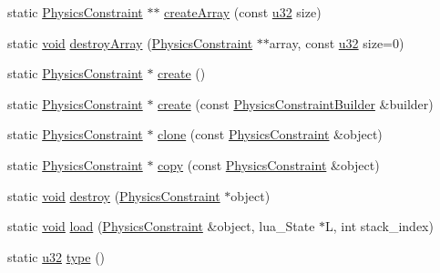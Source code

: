 \begin{DoxyCompactItemize}
\item 
static \mbox{\hyperlink{classnjli_1_1_physics_constraint}{Physics\+Constraint}} $\ast$$\ast$ \mbox{\hyperlink{classnjli_1_1_physics_constraint_a4d77bf76586344a445393a05f3295cb0}{create\+Array}} (const \mbox{\hyperlink{_util_8h_a10e94b422ef0c20dcdec20d31a1f5049}{u32}} size)
\item 
static \mbox{\hyperlink{_thread_8h_af1e856da2e658414cb2456cb6f7ebc66}{void}} \mbox{\hyperlink{classnjli_1_1_physics_constraint_a100472a7edab98f9bcd213459f3ae2c6}{destroy\+Array}} (\mbox{\hyperlink{classnjli_1_1_physics_constraint}{Physics\+Constraint}} $\ast$$\ast$array, const \mbox{\hyperlink{_util_8h_a10e94b422ef0c20dcdec20d31a1f5049}{u32}} size=0)
\item 
static \mbox{\hyperlink{classnjli_1_1_physics_constraint}{Physics\+Constraint}} $\ast$ \mbox{\hyperlink{classnjli_1_1_physics_constraint_a40da285e559ad3daf2ca60452a92a056}{create}} ()
\item 
static \mbox{\hyperlink{classnjli_1_1_physics_constraint}{Physics\+Constraint}} $\ast$ \mbox{\hyperlink{classnjli_1_1_physics_constraint_ab3c5d215f3df6f2ae6f6d1492114449b}{create}} (const \mbox{\hyperlink{classnjli_1_1_physics_constraint_builder}{Physics\+Constraint\+Builder}} \&builder)
\item 
static \mbox{\hyperlink{classnjli_1_1_physics_constraint}{Physics\+Constraint}} $\ast$ \mbox{\hyperlink{classnjli_1_1_physics_constraint_abffd36e886d036ee96c69857cfad4f9e}{clone}} (const \mbox{\hyperlink{classnjli_1_1_physics_constraint}{Physics\+Constraint}} \&object)
\item 
static \mbox{\hyperlink{classnjli_1_1_physics_constraint}{Physics\+Constraint}} $\ast$ \mbox{\hyperlink{classnjli_1_1_physics_constraint_a5c8b99c2a957918ee982a6101a4a6a8a}{copy}} (const \mbox{\hyperlink{classnjli_1_1_physics_constraint}{Physics\+Constraint}} \&object)
\item 
static \mbox{\hyperlink{_thread_8h_af1e856da2e658414cb2456cb6f7ebc66}{void}} \mbox{\hyperlink{classnjli_1_1_physics_constraint_a3b197c229e8bd4a030a54bdba54e081a}{destroy}} (\mbox{\hyperlink{classnjli_1_1_physics_constraint}{Physics\+Constraint}} $\ast$object)
\item 
static \mbox{\hyperlink{_thread_8h_af1e856da2e658414cb2456cb6f7ebc66}{void}} \mbox{\hyperlink{classnjli_1_1_physics_constraint_ab423c0c46435ea5630e50f1f39fb1dd8}{load}} (\mbox{\hyperlink{classnjli_1_1_physics_constraint}{Physics\+Constraint}} \&object, lua\+\_\+\+State $\ast$L, int stack\+\_\+index)
\item 
static \mbox{\hyperlink{_util_8h_a10e94b422ef0c20dcdec20d31a1f5049}{u32}} \mbox{\hyperlink{classnjli_1_1_physics_constraint_a213a1a155d46a52ef237cb4ed82a8607}{type}} ()
\end{DoxyCompactItemize}
